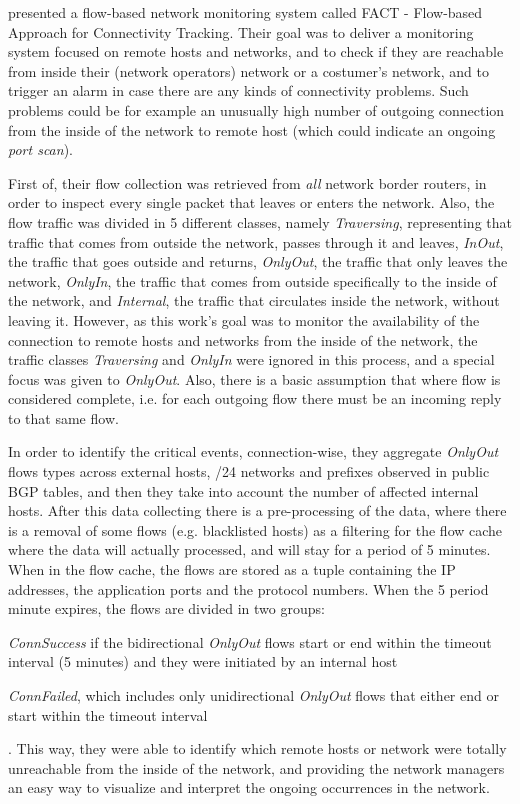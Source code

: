 \documentclass[runningheads,a4paper]{llncs}
\begin{document}
\cite{schatzmann2011fact} presented a flow-based network monitoring system called FACT - Flow-based Approach for Connectivity Tracking. Their goal was to deliver a monitoring system focused on remote hosts and networks, and to check if they are reachable from inside their (network operators) network or a costumer's network, and to trigger an alarm in case there are any kinds of connectivity problems. Such problems could be for example an unusually high number of outgoing connection from the inside of the network to remote host (which could indicate an ongoing \textit{port scan}).


First of, their flow collection was retrieved from \textit{all} network border routers, in order to inspect every single packet that leaves or enters the network. Also, the flow traffic was divided in 5 different classes, namely \textit{Traversing}, representing that traffic that comes from outside the network, passes through it and leaves, \textit{InOut}, the traffic that goes outside and returns, \textit{OnlyOut}, the traffic that only leaves the network, \textit{OnlyIn}, the traffic that comes from outside specifically to the inside of the network, and \textit{Internal}, the traffic that circulates inside the network, without leaving it. However, as this work's goal was to monitor the availability of the connection to remote hosts and networks from the inside of the network, the traffic classes \textit{Traversing} and \textit{OnlyIn} were ignored in this process, and a special focus was given to \textit{OnlyOut}. Also, there is a basic assumption that where flow is considered complete, i.e. for each outgoing flow there must be an incoming reply to that same flow.

In order to identify the critical events, connection-wise, they aggregate \textit{OnlyOut} flows types across external hosts, /24 networks and prefixes observed in public BGP tables, and then they take into account the number of affected internal hosts. After this data collecting there is a pre-processing of the data, where there is a removal of some flows (e.g. blacklisted hosts) as a filtering for the flow cache where the data will actually processed, and will stay for a period of 5 minutes. When in the flow cache, the flows are stored as a tuple containing the IP addresses, the application ports and the protocol numbers. When the 5 period minute expires, the flows are divided in two groups:
\begin{enumerate*}
\item \textit{ConnSuccess} if the bidirectional \textit{OnlyOut} flows start or end within the timeout interval (5 minutes) and they were initiated by an internal host
\item \textit{ConnFailed}, which includes only unidirectional \textit{OnlyOut} flows that either end or start within the timeout interval
\end{enumerate*}. This way, they were able to identify which remote hosts or network were totally unreachable from the inside of the network, and providing the network managers an easy way to visualize and interpret the ongoing occurrences in the network.
\end{document}
